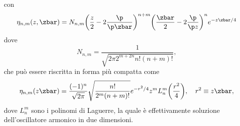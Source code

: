 con 
\begin{equation}
    \eta_{n,m}(z,\zbar) = N_{n,m}\bigg(\frac{z}{2} - 2\frac{\p}{\p\zbar}\bigg)^{n + m}\bigg(\frac{\zbar}{2} - 2\frac{\p}{\p z}\bigg)^ne^{-z\zbar/4}
\end{equation}
dove
\begin{equation}
    N_{n,m} = \frac{1}{\sqrt{2\pi 2^{m + 2n}n!(n + m)!}},
\end{equation}
che può essere riscritta in forma più compatta come
\begin{equation}
    \eta_{n,m}(z\zbar) = \frac{(-1)^n}{\sqrt{2\pi}}\sqrt{\frac{n!}{2^m(n + m)!}}e^{-r^2/4}z^mL_n^m\bigg(\frac{r^2}{4}\bigg),\quad r^2 \equiv z\zbar,
\end{equation}
dove $L^m_n$ sono i polinomi di Laguerre, la quale è effettivamente soluzione dell'oscillatore armonico in due dimensioni. 

